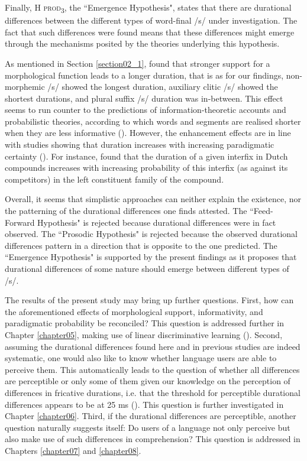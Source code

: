 Finally, \textsc{H prod\textsubscript{3}}, the ``Emergence Hypothesis", states that there are durational differences between the different types of word-final /s/ under investigation. The fact that such differences were found means that these differences might emerge through the mechanisms posited by the theories underlying this hypothesis. 

As mentioned in Section \ref{section02_1}, \citet{Tomaschek2019} found that stronger support for a morphological function leads to a longer duration, that is as for our findings, non-morphemic /s/ showed the longest duration, auxiliary clitic /s/ showed the shortest durations, and plural suffix /s/ duration was in-between. This effect seems to run counter to the predictions of information-theoretic accounts and probabilistic theories, according to which words and segments are realised shorter when they are less informative (\cite{Aylett2004,Jaeger2010,Priva2015}). However, the enhancement effects are in line with studies showing that duration increases with increasing paradigmatic certainty (\cite{Kuperman2007, Cohen2014, Bell2021, Tucker2019Sims}). For instance, \citet{Kuperman2007} found that the duration of a given interfix in Dutch compounds increases with increasing probability of this interfix (as against its competitors) in the left constituent family of the compound. 

Overall, it seems that simplistic approaches can neither explain the existence, nor the patterning of the durational differences one finds attested. The ``Feed-Forward Hypothesis" is rejected because durational differences were in fact observed. The ``Prosodic Hypothesis" is rejected because the observed durational differences pattern in a direction that is opposite to the one predicted. The ``Emergence Hypothesis" is supported by the present findings as it proposes that durational differences of some nature should emerge between different types of /s/.

The results of the present study may bring up further questions. First, how can the aforementioned effects of morphological support, informativity, and paradigmatic probability be reconciled? This question is addressed further in Chapter \ref{chapter05}, making use of linear discriminative learning (\cite{Baayen2019, Chuang2021}). Second, assuming the durational differences found here and in previous studies are indeed systematic, one would also like to know whether language users are able to perceive them. This automatically leads to the question of whether all differences are perceptible or only some of them given our knowledge on the perception of differences in fricative durations, i.e. that the threshold for perceptible durational differences appears to be at 25 ms (\cite{Klatt1975}). This question is further investigated in Chapter \ref{chapter06}. Third, if the durational differences are perceptible, another question naturally suggests itself: Do users of a language not only perceive but also make use of such differences in comprehension? This question is addressed in Chapters \ref{chapter07} and \ref{chapter08}.
